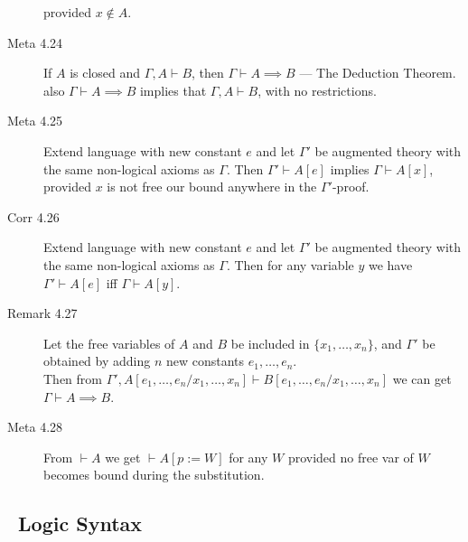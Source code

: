 \begin{description}
                     provided $x \notin A$.
  \item[Meta 4.24] If $A$ is closed and $\Gamma,A \vdash B$, then $\Gamma \vdash A \implies B$
       --- The Deduction Theorem.
   \\ also $\Gamma \vdash A \implies B$ implies that $\Gamma, A \vdash B$,
     with no restrictions.
  \item[Meta 4.25]
    Extend language with new constant $e$ and let $\Gamma'$
    be augmented theory with the same non-logical axioms as $\Gamma$.
    Then $\Gamma' \vdash A[e]$ implies $\Gamma \vdash A[x]$,
    provided $x$ is not free our bound anywhere in the $\Gamma'$-proof.
  \item[Corr 4.26]
    Extend language with new constant $e$ and let $\Gamma'$
    be augmented theory with the same non-logical axioms as $\Gamma$.
    Then for any variable $y$ we have $\Gamma' \vdash A[e]$ iff $\Gamma \vdash A[y]$.
  \item[Remark 4.27]
    Let the free variables of $A$ and $B$ be included in $\{x_1,\ldots,x_n\}$,
    and $\Gamma'$ be obtained by adding $n$ new constants $e_1,\ldots,e_n$.
    \\
    Then from $\Gamma',A[e_1,\ldots,e_n/x_1,\ldots,x_n]
               \vdash B[e_1,\ldots,e_n/x_1,\ldots,x_n]$
    we can get $\Gamma \vdash A \implies B$.
  \item[Meta 4.28]
    From $\vdash A$ we get $\vdash A[p:=W]$ for any $W$ provided no free var of $W$
    becomes bound during the substitution.
\end{description}

\newpage
\subsection{\ Logic Syntax}

